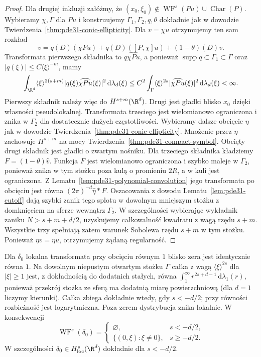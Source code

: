 \begin{proof}
Dla drugiej inkluzji załóżmy, że
$(x_0,\xi_0)\notin\operatorname{WF}^s(Pu)
\cup\operatorname{Char}(P)$.
Wybieramy $\chi,\Gamma$ dla $Pu$ i konstruujemy
$\Gamma_1,\Gamma_2,q,\theta$ dokładnie jak w dowodzie
Twierdzenia~\ref{thm:pde31-conic-ellipticity}.
Dla $v=\chi u$ otrzymujemy ten sam rozkład
\[
 v=q(D)(\chi Pu)+q(D)([P,\chi]u)+(1-\theta)(D)v.
\]
Transformata pierwszego składnika to
$q\widehat{\chi Pu}$, a ponieważ
$\operatorname{supp}q\subset\Gamma_1\subset\Gamma$
oraz $|q(\xi)|\le C\langle\xi\rangle^{-m}$,
mamy
\[
 \int_{\R^d}\langle\xi\rangle^{2(s+m)}
 |q(\xi)\widehat{\chi Pu}(\xi)|^2\,\mathrm d\lambda_d(\xi)
 \le C^2\int_\Gamma\langle\xi\rangle^{2s}
 |\widehat{\chi Pu}(\xi)|^2\,\mathrm d\lambda_d(\xi)
 <\infty .
\]
Pierwszy składnik należy więc do $H^{s+m}(\R^d)$.
Drugi jest gładki blisko $x_0$ dzięki własności
pseudolokalnej. Transformata trzeciego jest
wielomianowo ograniczona i znika w $\Gamma_2$
dla dostatecznie dużych częstotliwości.
Wybieramy dalsze obcięcie $\eta$ jak w dowodzie
Twierdzenia~\ref{thm:pde31-conic-ellipticity}.
Mnożenie przez $\eta$ zachowuje $H^{s+m}$
na mocy Twierdzenia~\ref{thm:pde31-compact-symbol}.
Obcięty drugi składnik jest gładki o zwartym
nośniku. Dla trzeciego składnika kładziemy
$F=(1-\theta)\widehat v$. Funkcja $F$ jest
wielomianowo ograniczona i szybko maleje
w $\Gamma_2$, ponieważ znika w tym stożku
poza kulą o promieniu $2R$, a w kuli jest ograniczona.
Z Lematu~\ref{lem:pde31-polynomial-convolution}
jego transformata po obcięciu jest równa
$(2\pi)^{-d}\widehat\eta*F$. Oszacowania
z dowodu Lematu~\ref{lem:pde31-cutoff}
dają szybki zanik tego splotu w dowolnym
mniejszym stożku z domknięciem na sferze
wewnątrz $\Gamma_2$. W szczególności wybierając
wykładnik zaniku $N>s+m+d/2$, uzyskujemy
całkowalność kwadratu z wagą rzędu $s+m$.
Wszystkie trzy spełniają zatem warunek Sobolewa
rzędu $s+m$ w tym stożku. Ponieważ $\eta v=\eta u$,
otrzymujemy żądaną regularność.
\end{proof}

\begin{przyklad}
Dla $\delta_0$ lokalna transformata przy obcięciu
równym $1$ blisko zera jest identycznie równa $1$.
Na dowolnym niepustym otwartym stożku $\Gamma$
całka z wagą $\langle\xi\rangle^{2s}$ dla
$|\xi|\ge1$ jest, z dokładnością do dodatnich
stałych, równa
$\int_1^\infty r^{2s+d-1}\,\mathrm d\lambda_1(r)$,
ponieważ przekrój stożka ze sferą ma dodatnią
miarę powierzchniową (dla $d=1$ liczymy kierunki).
Całka zbiega dokładnie wtedy, gdy $s<-d/2$;
przy równości rozbieżność jest logarytmiczna.
Poza zerem dystrybucja znika lokalnie.
W konsekwencji
\[
 \operatorname{WF}^s(\delta_0)=
 \begin{cases}
  \varnothing,&s<-d/2,\\
  \{(0,\xi):\xi\ne0\},&s\ge-d/2.
 \end{cases}
\]
W szczególności $\delta_0\in H^s_{\mathrm{loc}}(\R^d)$
dokładnie dla $s<-d/2$.
\end{przyklad}

